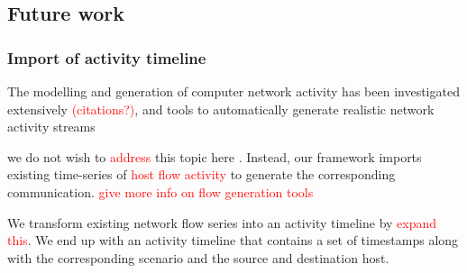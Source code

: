 \documentclass[runningheads]{llncs}
\begin{document}
\subsection{Future work}

\subsubsection*{Import of activity timeline}

The modelling and generation of computer network activity has been investigated extensively \textcolor{red}{(citations?)}, and tools to automatically generate realistic network activity streams 

we do not wish to \textcolor{red}{address} this topic here . Instead, our framework imports existing time-series of \textcolor{red}{host flow activity} to generate the corresponding communication. \textcolor{red}{give more info on flow generation tools} 

We transform existing network flow series into an activity timeline by \textcolor{red}{expand this}. We end up with an activity timeline that contains a set of timestamps along with the corresponding scenario and the source and destination host. 



\end{document}
